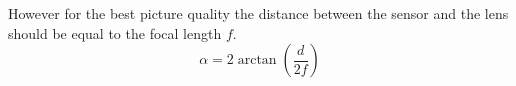 \documentclass[12pt,oneside,openany,a4paper, %
english, %
masters-t, goldenblock]{usthesis}
\begin{document}
However for the best picture quality the distance between the sensor and the lens should be equal to the focal length $f$.
\begin{equation}
  \alpha = 2 \arctan \left( \frac{d}{2f} \right)
\end{equation}

\end{document}
